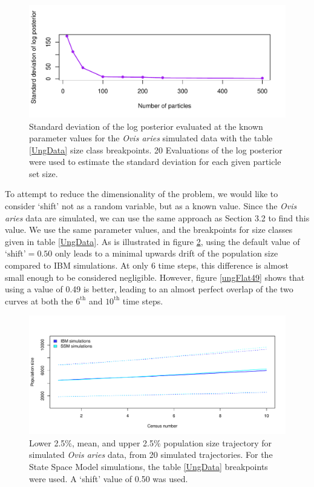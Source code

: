 \documentclass[a4paper,12pt]{article}
\begin{document}
\begin{figure}[H]
\centering
\includegraphics[scale=0.9]{particleNum.pdf}
\caption{\label{particleNum}Standard deviation of the log posterior evaluated at the known parameter values for the \textit{Ovis aries} simulated data with the table \ref{UngData} size class breakpoints. 20 Evaluations of the log posterior were used to estimate the standard deviation for each given particle set size.}
\end{figure}


To attempt to reduce the dimensionality of the problem, we would like to consider `shift' not as a random variable, but as a known value. Since the \textit{Ovis aries} data are simulated, we can use the same approach as Section 3.2 to find this value. We use the same parameter values, and the breakpoints for size classes given in table \ref{UngData}. As is illustrated in figure \ref{ungFlat50}, using the default value of $\text{`shift'} = 0.50$ only leads to a minimal upwards drift of the population size compared to IBM simulations. At only 6 time steps, this difference is almost small enough to be considered negligible. However, figure \ref{ungFlat49} shows that using a value of 0.49 is better, leading to an almost perfect overlap of the two curves at both the $6^{\text{th}}$ and $10^{\text{th}}$ time steps.

\begin{figure}[H]
\centering
\includegraphics[scale=0.65]{ungData50.pdf}
\caption{\label{ungFlat50}Lower 2.5\%, mean, and upper 2.5\% population size trajectory for simulated \textit{Ovis aries} data, from 20 simulated trajectories. For the State Space Model simulations, the table \ref{UngData} breakpoints were used. A `shift' value of 0.50 was used.}
\end{figure}
\end{document}
